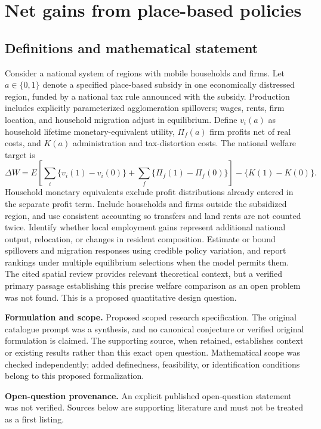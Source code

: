 \documentclass[11pt]{article}
\begin{document}
\section*{Net gains from place-based policies}\label{30007749}
\subsection{Definitions and mathematical statement}
Consider a national system of regions with mobile households and firms. Let \(a\in\{0,1\}\) denote a specified place-based subsidy in one economically distressed region, funded by a national tax rule announced with the subsidy. Production includes explicitly parameterized agglomeration spillovers; wages, rents, firm location, and household migration adjust in equilibrium. Define \(v_i(a)\) as household lifetime monetary-equivalent utility, \(\Pi_f(a)\) firm profits net of real costs, and \(K(a)\) administration and tax-distortion costs. The national welfare target is
\[\Delta W=E\!\left[\sum_i\{v_i(1)-v_i(0)\}+\sum_f\{\Pi_f(1)-\Pi_f(0)\}\right]-\{K(1)-K(0)\}.\]
Household monetary equivalents exclude profit distributions already entered in the separate profit term. Include households and firms outside the subsidized region, and use consistent accounting so transfers and land rents are not counted twice. Identify whether local employment gains represent additional national output, relocation, or changes in resident composition. Estimate or bound spillovers and migration responses using credible policy variation, and report rankings under multiple equilibrium selections when the model permits them. The cited spatial review provides relevant theoretical context, but a verified primary passage establishing this precise welfare comparison as an open problem was not found. This is a proposed quantitative design question.

\par\textbf{Formulation and scope.} Proposed scoped research specification. The original catalogue prompt was a synthesis, and no canonical conjecture or verified original formulation is claimed. The supporting source, when retained, establishes context or existing results rather than this exact open question. Mathematical scope was checked independently; added definedness, feasibility, or identification conditions belong to this proposed formalization.

\par\textbf{Open-question provenance.} An explicit published open-question statement was not verified. Sources below are supporting literature and must not be treated as a first listing.
\end{document}
